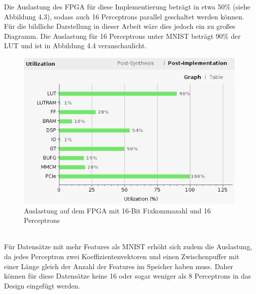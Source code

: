 Die Auslastung des FPGA für diese Implementierung beträgt in etwa 50\% (siehe Abbildung 4.3), sodass auch 16 Perceptrons parallel geschaltet werden können. Für die bildliche Darstellung in dieser Arbeit wäre dies jedoch ein zu großes Diagramm. 
Die Auslastung für 16 Perceptrons unter MNIST beträgt 90\% der LUT und ist in Abbildung 4.4 veranschaulicht. \\
\begin{figure}[ht]
\centering
\includegraphics[scale=0.95]{bilder/auslastung2}
\caption{Auslastung auf dem FPGA mit 16-Bit Fixkommazahl und 16 Perceptrons}
\end{figure}\\
Für Datensätze mit mehr Features als MNIST erhöht sich zudem die Auslastung, da jedes Perceptron zwei Koeffizientenvektoren und einen Zwischenpuffer mit einer Länge gleich der Anzahl der Features im Speicher haben muss. Daher können für diese Datensätze keine 16 oder sogar weniger als 8 Perceptrons in das Design eingefügt werden.

